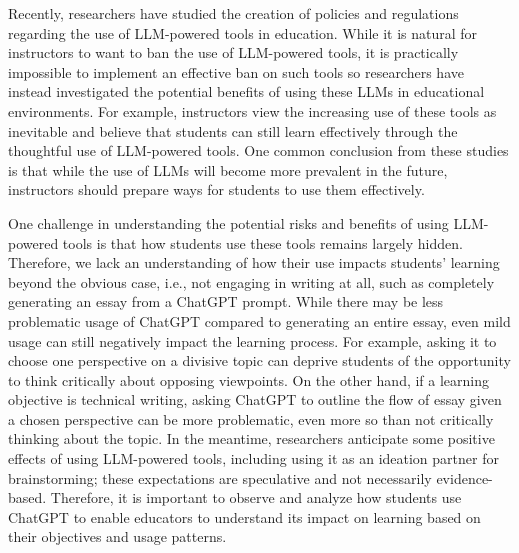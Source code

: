 \documentclass[manuscript,screen,acmsmall]{acmart}
\begin{document}
Recently, researchers have studied the creation of policies and regulations regarding the use of LLM-powered tools in education. While it is natural for instructors to want to ban the use of LLM-powered tools, it is practically impossible to implement an effective ban on such tools so researchers have instead investigated the potential benefits of using these LLMs in educational environments. For example, instructors view the increasing use of these tools as inevitable and believe that students can still learn effectively through the thoughtful use of LLM-powered tools.  One common conclusion from these studies is that while the use of LLMs will become more prevalent in the future, instructors should prepare ways for students to use them effectively.

One challenge in understanding the potential risks and benefits of using LLM-powered tools is that how students use these tools remains largely hidden. Therefore, we lack an understanding of how their use impacts students' learning beyond the obvious case, i.e., not engaging in writing at all, such as completely generating an essay from a ChatGPT prompt. While there may be less problematic usage of ChatGPT compared to generating an entire essay, even mild usage can still negatively impact the learning process. For example, asking it to choose one perspective on a divisive topic can deprive students of the opportunity to think critically about opposing viewpoints. On the other hand, if a learning objective is technical writing, asking ChatGPT to outline the flow of essay given a chosen perspective can be more problematic, even more so than not critically thinking about the topic. In the meantime, researchers anticipate some positive effects of using LLM-powered tools, including using it as an ideation partner for brainstorming; these expectations are speculative and not necessarily evidence-based. Therefore, it is important to observe and analyze how students use ChatGPT to enable educators to understand its impact on learning based on their objectives and usage patterns.

\end{document}
